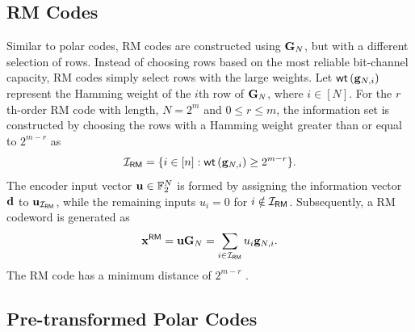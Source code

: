 \documentclass[conference]{IEEEtran}
\begin{document}
\subsection{RM Codes}
Similar to polar codes, RM codes are constructed using ${\bf G}_N$, but with a different selection of rows. Instead of choosing rows based on the most reliable bit-channel capacity, RM codes simply select rows with the large weights. Let ${\sf wt}\left({\bf g}_{N,i}\right)$ represent the Hamming weight of the $i$th row of ${\bf G}_N$, where $i\in [N]$. For the $r$th-order RM code with length, $N=2^m$ and $0\leq r \leq m$, the information set is constructed by choosing the rows with a Hamming weight greater than or equal to $2^{m-r}$ as
\begin{align}
	\mathcal{I}_{{\sf RM}}=\{i\in [n]: {\sf wt}\left({\bf g}_{N,i} \right)\geq 2^{m-r}\}.
\end{align}
The encoder input vector ${\bf u}\in \mathbb{F}_2^N$ is formed by assigning the information vector ${\bf d}$ to ${\bf u}_{\mathcal{I}_{{\sf RM}}}$, while the remaining inputs $u_i=0$ for $i\notin \mathcal{I}_{{\sf RM}}$. Subsequently, a RM codeword is generated as 
\begin{align}
	{\bf x}^{\sf RM}={\bf u}{\bf G}_N=\sum_{i\in \mathcal{I}_{{\sf RM}}} u_i {\bf g}_{N,i}.
\end{align}
The RM code has a minimum distance of $2^{m-r}$ \cite{Abbe-Reed-Muller}. 





 
 
\subsection{Pre-transformed Polar Codes}
\end{document}
